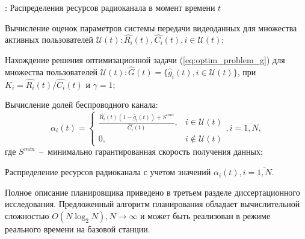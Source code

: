 \begin{algorithm}
  \caption{: Распределения ресурсов радиоканала в момент времени $t$}
	\label{alg:sched}
  \begin{algorithmic}[1]
	\item Вычисление оценок параметров системы передачи видеоданных для множества активных пользователей $\mathcal{U}(t): \hat{R_i}(t), \hat{C_i}(t), i \in \mathcal{U}(t)$;
	\item Нахождение решения оптимизационной задачи (\ref{eq:optim_problem_g}) для множества пользователей $\mathcal{U}(t):\hat{G}(t) = \{\hat{g}_i(t), i \in \mathcal{U}(t)\}$, при $K_i = \hat{R_i}(t) / \hat{C_i}(t)$ и $\gamma = 1$;
	\item Вычисление долей беспроводного канала:$$\alpha_i(t) = \begin{cases}
					\frac{\hat{R_i}(t) (1 - \hat{g}_i(t)) + S^{min}}{\hat{C_i}(t)}, & i \in \mathcal{U}(t) \\
					0, & i \notin \mathcal{U}(t)
					\end{cases}, i = \overline{1,N},$$
					где $S^{min}$~--~минимально гарантированная скорость получения данных;
	\item Распределение ресурсов радиоканала с учетом значений $\alpha_i(t), i = \overline{1,N}$.
  \end{algorithmic}
\end{algorithm}
Полное описание планировщика приведено в третьем разделе диссертационного исследования. Предложенный алгоритм планирования обладает вычислительной сложностью $O(N \log_{2}N), N \to \infty$ и может быть реализован в режиме реального времени на базовой станции.

